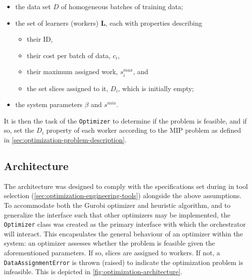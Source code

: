 \documentclass[../mthe-493-final-project.tex]{subfiles}
\begin{document}
    \begin{itemize}
        \item the data set $D$ of homogeneous batches of training data;
        \item the set of learners (workers) $\mathbf{L}$, each with properties describing
        \begin{itemize}
            \item their ID,
            \item their cost per batch of data, $c_i$,
            \item their maximum assigned work, $s^{max}_i$, and
            \item the set slices assigned to it, $D_i$, which is initially empty;
        \end{itemize}
        \item the system parameters $\beta$ and $s^{min}$.
    \end{itemize}
    
    It is then the task of the \texttt{Optimizer} to determine if the problem is feasible, and if so, set the $D_i$ property of each worker according to the MIP problem as defined in \autoref{sec:optimization-problem-description}.
    
    \subsection{Architecture}
    \label{ssec:optimization-architecture-implementation}
    
    The architecture was designed to comply with the specifications set during in tool selection (\autoref{sec:optimization-engineering-tools}) alongside the above assumptions. To accommodate both the Gurobi optimizer and heuristic algorithm, and to generalize the interface such that other optimizers may be implemented, the \texttt{Optimizer} class was created as the primary interface with which the orchestrator will interact. This encapsulates the general behaviour of an optimizer within the system: an optimizer assesses whether the problem is feasible given the aforementioned parameters. If so, slices are assigned to workers. If not, a \texttt{DataAssignmentError} is thrown (raised) to indicate the optimization problem is infeasible. This is depicted in \autoref{fig:optimization-architecture}.
    
\end{document}
